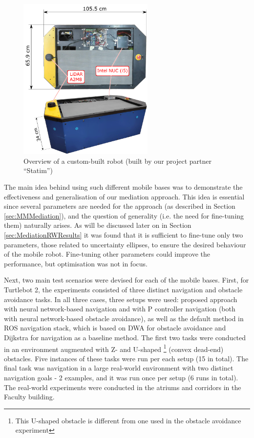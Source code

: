 \begin{figure}
\centering
\includegraphics[width=0.6\textwidth]{slike/Fig03_15.png}
\caption[Overview of a custom-built robot]{Overview of a custom-built robot (built by our project partner ``Statim'')}
\label{Fig:paletarCombo}
\end{figure}

The main idea behind using such different mobile bases was to demonstrate the effectiveness and generalisation of our mediation approach. This idea is essential since several parameters are needed for the approach (as described in Section \ref{sec:MMMediation}), and the question of generality (i.e. the need for fine-tuning them) naturally arises. As will be discussed later on in Section \ref{sec:MediationRWResults} it was found that it is sufficient to fine-tune only two parameters, those related to uncertainty ellipses, to ensure the desired behaviour of the mobile robot. Fine-tuning other parameters could improve the performance, but optimisation was not in focus.

Next, two main test scenarios were devised for each of the mobile bases. First, for Turtlebot 2, the experiments consisted of three distinct navigation and obstacle avoidance tasks. In all three cases, three setups were used: proposed approach with neural network-based navigation and with P controller navigation (both with neural network-based obstacle avoidance), as well as the default method in ROS navigation stack, which is based on DWA for obstacle avoidance and Dijkstra for navigation as a baseline method. The first two tasks were conducted in an environment augmented with Z- and U-shaped \footnote{This U-shaped obstacle is different from one used in the obstacle avoidance experiment} (convex dead-end) obstacles. Five instances of these tasks were run per each setup (15 in total). The final task was navigation in a large real-world environment with two distinct navigation goals - 2 examples, and it was run once per setup (6 runs in total). The real-world experiments were conducted in the atriums and corridors in the Faculty building.


